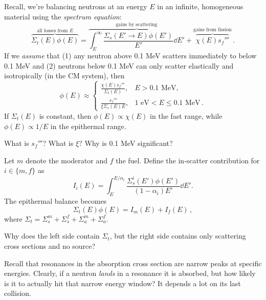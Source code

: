 \begin{handoutcolumns}

Recall, we're balancing neutrons at an energy $E$ in an infinite, homogeneous
material using the {\it spectrum equation}:
\begin{equation*}
  \overbrace{\Sigma_t(E)\phi(E)}^{\text{all losses from } E} =
    \overbrace{\int_E^{\infty} \frac{\Sigma_s(E'\to E)\phi(E')}{E'} \dd E'}^{\text{gains by scattering}}
    + \overbrace{\chi(E)s_f'''}^{\text{gains from fission}} \, .
\end{equation*}
If we {\it assume} that (1) any neutron above 0.1 MeV scatters immediately to below 0.1 MeV and
(2) neutrons below 0.1 MeV can only scatter elastically and isotropically (in the CM system), then
\begin{equation*}
  \phi(E) \approx
  \begin{cases}
    \displaystyle\frac{\chi(E) s_f'''}{\Sigma_t(E)}  , & E > 0.1\text{ MeV},                  \\
    \displaystyle\frac{s_f'''}{\xi \Sigma_s(E) E},     & 1\text{ eV} < E \le 0.1\text{ MeV} \, .
  \end{cases}
\end{equation*}
If $\Sigma_t(E)$ is constant, then $\phi(E) \propto \chi(E)$ in the fast range, while
$\phi(E) \propto 1/E$ in the epithermal range.

\begin{checkpoint}
What is $s_f'''$?  What is $\xi$?  Why is 0.1 MeV significant?
\end{checkpoint}


Let $m$ denote the moderator and $f$ the fuel. Define the in-scatter contribution for $i \in \{m, f\}$ as
$$
 I_i(E)=\int_E^{E/\alpha_i}
 \frac{\Sigma_s^i(E')\phi(E')}{(1-\alpha_i)E'}\dd E'.
$$
The epithermal balance becomes
$$
 \boxed{\Sigma_t(E)\phi(E)=I_m(E)+I_f(E)} \, ,
$$
where $\Sigma_t=\Sigma_s^m+\Sigma_s^f+\Sigma_a^m+\Sigma_a^f$.

\begin{checkpoint}
Why does the left side contain $\Sigma_t$, but the right side contains only scattering cross sections and no source?

\end{checkpoint}

\switchcolumn
\RaggedRight
{}

Recall that resonances in the absorption cross section are narrow peaks at specific energies.
Clearly, if a neutron {\it lands} in a resonance it is absorbed, but how likely is it
to actually hit that narrow energy window?  It depends a lot on its last collision.


\end{handoutcolumns}
